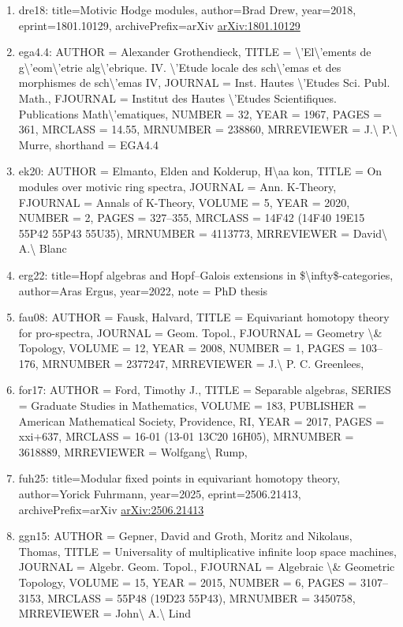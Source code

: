 \documentclass[11pt]{article}
\begin{document}
\begin{enumerate}[leftmargin=*]
  \item dre18: title=Motivic Hodge modules, author=Brad Drew, year=2018, eprint=1801.10129, archivePrefix=arXiv \href{https://arxiv.org/abs/1801.10129}{arXiv:1801.10129}
  \item ega4.4: AUTHOR = Alexander Grothendieck, TITLE = \textbackslash{}'El\textbackslash{}'ements de g\textbackslash{}'eom\textbackslash{}'etrie alg\textbackslash{}'ebrique. IV. \textbackslash{}'Etude locale des sch\textbackslash{}'emas et des morphismes de sch\textbackslash{}'emas IV, JOURNAL = Inst. Hautes \textbackslash{}'Etudes Sci. Publ. Math., FJOURNAL = Institut des Hautes \textbackslash{}'Etudes Scientifiques. Publications Math\textbackslash{}'ematiques, NUMBER = 32, YEAR = 1967, PAGES = 361, MRCLASS = 14.55, MRNUMBER = 238860, MRREVIEWER = J.\textbackslash{} P.\textbackslash{} Murre, shorthand = EGA4.4
  \item ek20: AUTHOR = Elmanto, Elden and Kolderup, H\textbackslash{}aa kon, TITLE = On modules over motivic ring spectra, JOURNAL = Ann. K-Theory, FJOURNAL = Annals of K-Theory, VOLUME = 5, YEAR = 2020, NUMBER = 2, PAGES = 327--355, MRCLASS = 14F42 (14F40 19E15 55P42 55P43 55U35), MRNUMBER = 4113773, MRREVIEWER = David\textbackslash{} A.\textbackslash{} Blanc
  \item erg22: title=Hopf algebras and Hopf--Galois extensions in \$\textbackslash{}infty\$-categories, author=Aras Ergus, year=2022, note = PhD thesis
  \item fau08: AUTHOR = Fausk, Halvard, TITLE = Equivariant homotopy theory for pro-spectra, JOURNAL = Geom. Topol., FJOURNAL = Geometry \textbackslash{}\& Topology, VOLUME = 12, YEAR = 2008, NUMBER = 1, PAGES = 103--176, MRNUMBER = 2377247, MRREVIEWER = J.\textbackslash{} P. C. Greenlees,
  \item for17: AUTHOR = Ford, Timothy J., TITLE = Separable algebras, SERIES = Graduate Studies in Mathematics, VOLUME = 183, PUBLISHER = American Mathematical Society, Providence, RI, YEAR = 2017, PAGES = xxi+637, MRCLASS = 16-01 (13-01 13C20 16H05), MRNUMBER = 3618889, MRREVIEWER = Wolfgang\textbackslash{} Rump,
  \item fuh25: title=Modular fixed points in equivariant homotopy theory, author=Yorick Fuhrmann, year=2025, eprint=2506.21413, archivePrefix=arXiv \href{https://arxiv.org/abs/2506.21413}{arXiv:2506.21413}
  \item ggn15: AUTHOR = Gepner, David and Groth, Moritz and Nikolaus, Thomas, TITLE = Universality of multiplicative infinite loop space machines, JOURNAL = Algebr. Geom. Topol., FJOURNAL = Algebraic \textbackslash{}\& Geometric Topology, VOLUME = 15, YEAR = 2015, NUMBER = 6, PAGES = 3107--3153, MRCLASS = 55P48 (19D23 55P43), MRNUMBER = 3450758, MRREVIEWER = John\textbackslash{} A.\textbackslash{} Lind

\end{enumerate}
\end{document}
